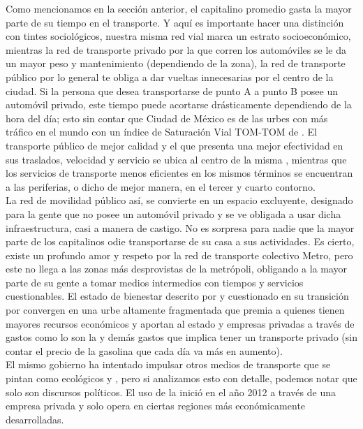 Como mencionamos en la sección anterior, el capitalino promedio gasta la mayor parte de su tiempo en el transporte. 
Y aquí es importante hacer una distinción con tintes sociológicos, nuestra misma red vial marca un estrato socioeconómico, 
mientras la red de transporte privado por la que corren los automóviles se le da un mayor peso y 
mantenimiento (dependiendo de la zona), la red de transporte público por lo general te obliga a dar vueltas innecesarias 
por el centro de la ciudad. Si la persona que desea transportarse de punto A a punto B posee un automóvil privado, este 
tiempo puede acortarse drásticamente dependiendo de la hora del día; esto sin contar que Ciudad de México es de las 
urbes con más tráfico en el mundo con un índice de Saturación Vial TOM-TOM de  \cite{tomtom2026traffic}. 
El transporte público de mejor calidad y el que presenta una mejor efectividad en sus traslados, velocidad y servicio 
se ubica al centro de la misma \zmvm, mientras que los servicios de transporte menos eficientes en los mismos términos 
se encuentran a las periferias, o dicho de mejor manera, en el tercer y cuarto contorno. \\
La red de movilidad público así, se convierte en un espacio excluyente, designado para la gente que no posee un automóvil 
privado y se ve obligada a usar dicha infraestructura, casi a manera de castigo. No es sorpresa para nadie que la mayor parte 
de los capitalinos odie transportarse de su casa a sus actividades. Es cierto, existe un profundo amor y respeto por la red 
de transporte colectivo Metro, pero este no llega a las zonas más desprovistas de la metrópoli, obligando a la mayor parte 
de su gente a tomar medios intermedios con tiempos y servicios cuestionables. El estado de bienestar descrito por 
\cite{topalov_cuestion} y cuestionado en su transición por \cite{bauman_estado} convergen en una urbe altamente fragmentada 
que premia a quienes tienen mayores recursos económicos y aportan al estado y empresas privadas a través de gastos como lo son 
la  y demás gastos que implica tener 
un transporte privado (sin contar el precio de la gasolina que cada día va más en aumento). \\
El mismo gobierno ha intentado impulsar otros medios de transporte que se pintan como ecológicos y , 
pero si analizamos esto con detalle, podemos notar que solo son discursos políticos. El uso de la  
inició en el año 2012 a través de una empresa privada y solo opera en ciertas regiones más económicamente desarrolladas. 
